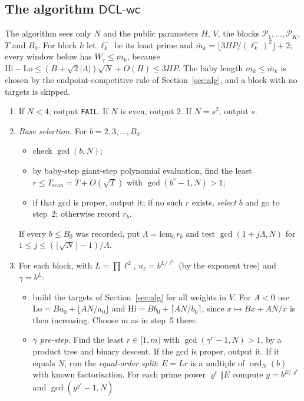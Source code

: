 \documentclass[11pt]{amsart}
\theoremstyle{definition}
\newcommand{\ord}{\operatorname{ord}}
\newcommand{\DCLwc}{\textsf{DCL-wc}}
\begin{document}
\subsection{The algorithm \texorpdfstring{$\DCLwc$}{DCL-wc}}
The algorithm sees only $N$ and the public parameters $H$, $V$, the blocks $\mathcal P_1,\dots,
\mathcal P_K$, $T$ and $B_0$. For block $k$ let $\ell_k^-$ be its least prime and
$\bar m_k=\lfloor 3HP/(\ell_k^-)^2\rfloor+2$; every window below has $W_\tau\le\bar m_k$,
because $\mathrm{Hi}-\mathrm{Lo}\le(B+\sqrt2|A|)\sqrt N+O(H)\le3HP$. The baby length $m_k\le\bar
m_k$ is chosen by the endpoint-competitive rule of Section~\ref{sec:alg}, and a block with no
targets is skipped.
\begin{enumerate}[label=\arabic*.,start=0]
\item If $N<4$, output \texttt{FAIL}. If $N$ is even, output $2$. If $N=s^2$, output $s$.
\item \emph{Base selection.} For $b=2,3,\dots,B_0$:
  \begin{itemize}
  \item check $\gcd(b,N)$;
  \item by baby-step giant-step polynomial evaluation, find the least $r\le T_{\mathrm{scan}}=
    T+O(\sqrt T)$ with $\gcd(b^r-1,N)>1$;
  \item if that gcd is proper, output it; if no such $r$ exists, \emph{select} $b$ and go to
    step~2; otherwise record $r_b$.
  \end{itemize}
  If every $b\le B_0$ was recorded, put $\Lambda=\mathrm{lcm}_b\,r_b$ and test
  $\gcd(1+j\Lambda,N)$ for $1\le j\le(\lfloor\sqrt N\rfloor-1)/\Lambda$.
\item For each block, with $L=\prod\ell^2$, $u_\ell=b^{L/\ell^2}$ (by the exponent tree) and
  $\gamma=b^L$:
  \begin{itemize}
  \item build the targets of Section~\ref{sec:alg} for all weights in $V$. For $A<0$ use
    $\mathrm{Lo}=Ba_0+\lfloor AN/a_0\rfloor$ and $\mathrm{Hi}=Bb_0+\lceil AN/b_0\rceil$, since
    $x\mapsto Bx+AN/x$ is then increasing. Choose $m$ as in step~5 there.
  \item \emph{$\gamma$ pre-step.} Find the least $r\in[1,m)$ with $\gcd(\gamma^r-1,N)>1$, by a
    product tree and binary descent. If the gcd is proper, output it. If it equals $N$, run the
    \emph{equal-order split}: $E=Lr$ is a multiple of $\ord_N(b)$ with known factorisation. For
    each prime power $\varrho^e\Vert E$ compute $y=b^{E/\varrho^e}$ and $\gcd(y^{\varrho^i}-1,N)$

\end{itemize}
\end{enumerate}
\end{document}
